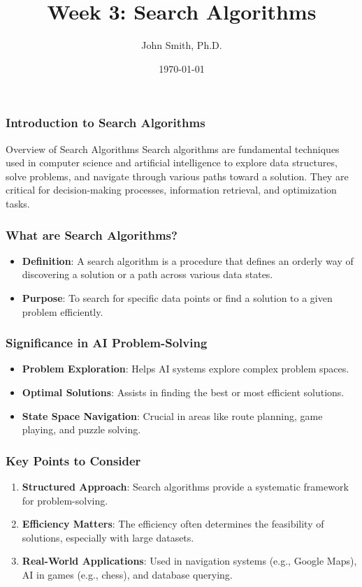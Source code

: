 \documentclass[aspectratio=169]{beamer}
\title[Search Algorithms]{Week 3: Search Algorithms}
\author[J. Smith]{John Smith, Ph.D.}
\institute[University Name]{
  Department of Computer Science\\
  University Name\\
  \vspace{0.3cm}
  Email: email@university.edu\\
  Website: www.university.edu
}
\date{\today}
\begin{document}
\frame{\titlepage}

\begin{frame}[fragile]
    \frametitle{Introduction to Search Algorithms}
    \begin{block}{Overview of Search Algorithms}
        Search algorithms are fundamental techniques used in computer science and artificial intelligence to explore data structures, solve problems, and navigate through various paths toward a solution. They are critical for decision-making processes, information retrieval, and optimization tasks.
    \end{block}
\end{frame}

\begin{frame}[fragile]
    \frametitle{What are Search Algorithms?}
    \begin{itemize}
        \item \textbf{Definition}: A search algorithm is a procedure that defines an orderly way of discovering a solution or a path across various data states.
        \item \textbf{Purpose}: To search for specific data points or find a solution to a given problem efficiently.
    \end{itemize}
\end{frame}

\begin{frame}[fragile]
    \frametitle{Significance in AI Problem-Solving}
    \begin{itemize}
        \item \textbf{Problem Exploration}: Helps AI systems explore complex problem spaces.
        \item \textbf{Optimal Solutions}: Assists in finding the best or most efficient solutions.
        \item \textbf{State Space Navigation}: Crucial in areas like route planning, game playing, and puzzle solving.
    \end{itemize}
\end{frame}

\begin{frame}[fragile]
    \frametitle{Key Points to Consider}
    \begin{enumerate}
        \item \textbf{Structured Approach}: Search algorithms provide a systematic framework for problem-solving.
        \item \textbf{Efficiency Matters}: The efficiency often determines the feasibility of solutions, especially with large datasets.
        \item \textbf{Real-World Applications}: Used in navigation systems (e.g., Google Maps), AI in games (e.g., chess), and database querying.
    \end{enumerate}
\end{frame}
\end{document}
